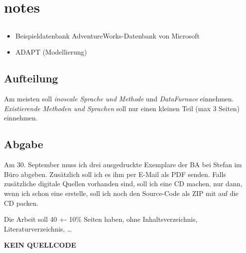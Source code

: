 \chapter{notes}
\section{}
\begin{itemize}
  \item Beispieldatenbank AdventureWorks-Datenbank von Microsoft
  \item ADAPT (Modellierung)
\end{itemize}

\section{Aufteilung}
Am meisten soll \textit{inoscale Sprache und Methode} und \textit{DataFurnace} einnehmen. \textit{Existierende Methoden und Sprachen} soll nur einen kleinen Teil (max 3 Seiten) einnehmen.

\section{Abgabe}
Am 30. September muss ich drei ausgedruckte Exemplare der BA bei Stefan im Büro
abgeben. Zusätzlich soll ich es ihm per E-Mail als PDF senden. Falls
zusätzliche digitale Quellen vorhanden sind, soll ich eine CD machen, nur dann,
wenn ich schon eine erstelle, soll ich noch den Source-Code als ZIP mit auf die
CD packen.

Die Arbeit soll 40 +- 10\% Seiten haben, ohne Inhaltsverzeichnis, Literaturverzeichnis, \ldots


\textbf{KEIN QUELLCODE}
